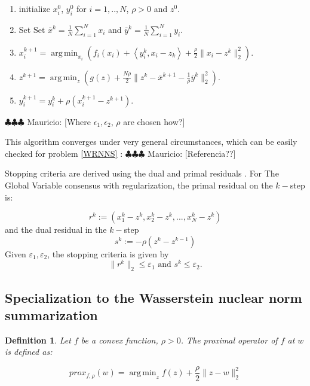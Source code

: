 \documentclass[12pt]{amsart}
\newtheorem{definition}[lemma]{Definition}
\theoremstyle{remark}
\DeclareMathOperator*{\argmin}{arg\,min}
\newcommand{\mv}[1]{{\color{red} \sf $\clubsuit\clubsuit\clubsuit$ Mauricio: [#1]}}
\begin{document}
\begin{enumerate}
\item initialize $x^0_i$, $y^0_i$ for $i=1,..,N$, $\rho>0$ and $z^0$.
\item Set $ \text{Set } \bar{x}^{k} = \frac{1}{N}\sum_{i=1}^N x_i $ and $\bar{y}^{k} = \frac{1}{N}\sum_{i=1}^N y_i $.
\item $x_i^{k+1} = \argmin_{x_i} \left( f_i(x_i) + \left \langle y_i^k,x_i-z_k \right \rangle +\frac{\rho}{2}\|x_i-z^k\|_2^2\right ).$
\item $z^{k+1} = \argmin_z \left (g(z)+\frac{N\rho}{2}\|z^k-\bar{x}^{k+1} -\frac{1}{\rho}\bar{y}^k \|_2^2 \right ).$
\item $y_i^{k+1} = y_i^k + \rho(x_i^{k+1}-z^{k+1}).$
\end{enumerate}
\mv{Where $\epsilon_1,\epsilon_2$, $\rho$ are chosen how?}




This algorithm converges under very general circumstances, which can be easily checked for problem \ref{WRNNS} :\mv{Referencia??}

Stopping criteria are derived using the dual and primal residuals  \cite{boyd2011distributed}.
For The Global Variable consensus with regularization, the 
primal residual on the $k-$step is: 

\[
r^k:=(x_1^k-z^k,x_2^k-z^k,...,x_N^k-z^k)
\]
and the dual residual in the $k-$step
\[
s^k:= -\rho(z^k-z^{k-1})
\]
Given $\varepsilon_1,\varepsilon_2$, the stopping criteria is given by
\[
\|r^k\|_2 \leq \varepsilon_1 \text{ and } s^k \leq \varepsilon_2.
\]







\subsection{Specialization to the Wasserstein nuclear norm summarization}


\begin{definition}
Let $f$ be a convex function, $\rho > 0$. The proximal operator of $f$ at $w$ is defined as:

\[
prox_{f,\rho}(w) = \argmin_{z} f(z)+ \frac{\rho}{2}\|z-w\|_2^2
\]

\end{definition}
\end{document}
